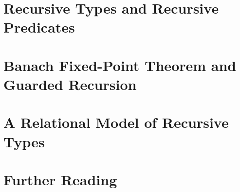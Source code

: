 \section{Recursive Types and Recursive Predicates}

\section{Banach Fixed-Point Theorem and Guarded Recursion}

\section{A Relational Model of Recursive Types}

\section{Further Reading}
